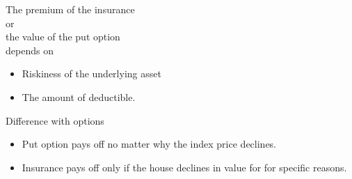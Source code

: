 \begin{frame}[fragile]
\begin{center}
	\begin{minipage}{0.5\textwidth}
		\centering
		The premium of the insurance \\
		or                           \\
		the value of the put option  \\
		depends on\\

		\begin{itemize}
			\item Riskiness of the underlying asset
			\item The amount of deductible.
		\end{itemize}
	\end{minipage}

	\pause
	\bigskip
	\mySeparateLine
	\bigskip

	\begin{minipage}{0.65\textwidth}
		\centering
		Difference with options

		\begin{itemize}
			\item Put option pays off no matter why the index price declines.
			\item Insurance pays off only if the house declines in value for for specific reasons.
		\end{itemize}
	\end{minipage}

\end{center}
\end{frame}

